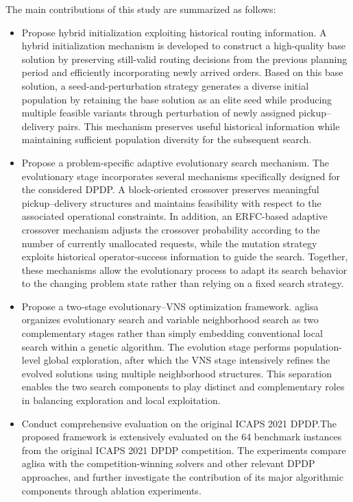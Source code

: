 \documentclass[11pt]{article}
\begin{document}
{\color{blue}
The main contributions of this study are summarized as follows:
\begin{itemize}
\item Propose hybrid initialization exploiting historical routing information. A hybrid initialization mechanism is developed to construct a high-quality base solution by preserving still-valid routing decisions from the previous 
planning period and efficiently incorporating newly arrived orders. Based on this base solution, a seed-and-perturbation strategy generates a diverse initial population by retaining the base solution as an elite seed while producing multiple feasible variants through perturbation of newly assigned 
pickup--delivery pairs. This mechanism preserves useful historical information while maintaining sufficient population diversity for the subsequent search.
\item Propose a problem-specific adaptive evolutionary search mechanism. The evolutionary stage incorporates several mechanisms specifically designed for the considered DPDP. A block-oriented crossover preserves meaningful pickup--delivery structures and maintains feasibility with respect to the associated operational constraints. In addition, an ERFC-based adaptive crossover mechanism adjusts the crossover probability according to the 
number of currently unallocated requests, while the mutation strategy exploits historical operator-success information to guide the search. Together, these mechanisms allow the evolutionary process to adapt its search behavior to the changing problem state rather than relying on a fixed search strategy.
\item Propose a two-stage evolutionary--VNS optimization framework. \gls{aglisa} organizes evolutionary search and variable neighborhood search as two complementary stages rather than simply embedding conventional local search within a genetic algorithm. The evolution stage performs population-level global exploration, after which the VNS stage intensively refines the evolved solutions using multiple neighborhood structures. This separation enables the two search components to play distinct and complementary roles in balancing exploration and local exploitation.
\item Conduct comprehensive evaluation on the original ICAPS 2021 DPDP.The proposed framework is extensively evaluated on the 64 benchmark instances from the original ICAPS 2021 DPDP competition. The experiments compare \gls{aglisa} with the competition-winning solvers and other relevant DPDP approaches, and further investigate the contribution of its major algorithmic components through ablation experiments.
\end{itemize}}
\end{document}

